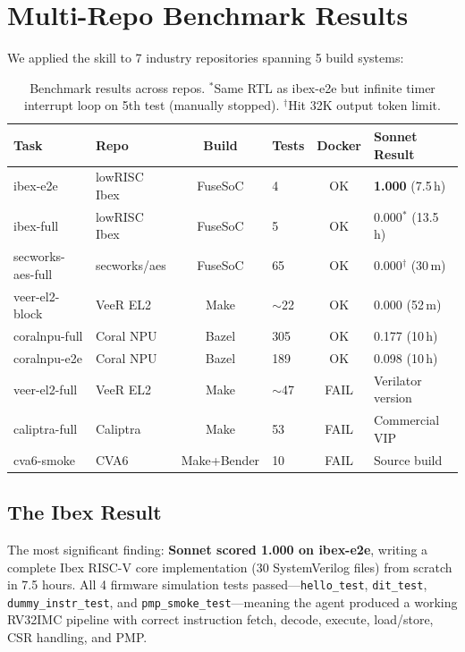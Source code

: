 \documentclass[11pt,a4paper]{article}
\begin{document}
\section{Multi-Repo Benchmark Results}

We applied the skill to 7 industry repositories spanning 5 build systems:

\begin{table}[h]
\centering
\small
\begin{tabularx}{\textwidth}{@{}llclcX@{}}
\toprule
\textbf{Task} & \textbf{Repo} & \textbf{Build} & \textbf{Tests} & \textbf{Docker} & \textbf{Sonnet Result} \\
\midrule
ibex-e2e & lowRISC Ibex & FuseSoC & 4 & OK & \textbf{1.000} (7.5\,h) \\
ibex-full & lowRISC Ibex & FuseSoC & 5 & OK & 0.000$^*$ (13.5\,h) \\
secworks-aes-full & secworks/aes & FuseSoC & 65 & OK & 0.000$^\dagger$ (30\,m) \\
veer-el2-block & VeeR EL2 & Make & $\sim$22 & OK & 0.000 (52\,m) \\
coralnpu-full & Coral NPU & Bazel & 305 & OK & 0.177 (10\,h) \\
coralnpu-e2e & Coral NPU & Bazel & 189 & OK & 0.098 (10\,h) \\
\midrule
veer-el2-full & VeeR EL2 & Make & $\sim$47 & FAIL & Verilator version \\
caliptra-full & Caliptra & Make & 53 & FAIL & Commercial VIP \\
cva6-smoke & CVA6 & Make+Bender & 10 & FAIL & Source build \\
\bottomrule
\end{tabularx}
\caption{Benchmark results across repos. $^*$Same RTL as ibex-e2e but infinite timer interrupt loop on 5th test (manually stopped). $^\dagger$Hit 32K output token limit.}
\label{tab:results}
\end{table}

\subsection{The Ibex Result}

The most significant finding: \textbf{Sonnet scored 1.000 on ibex-e2e}, writing a complete Ibex RISC-V core implementation (30 SystemVerilog files) from scratch in 7.5 hours. All 4 firmware simulation tests passed---\texttt{hello\_test}, \texttt{dit\_test}, \texttt{dummy\_instr\_test}, and \texttt{pmp\_smoke\_test}---meaning the agent produced a working RV32IMC pipeline with correct instruction fetch, decode, execute, load/store, CSR handling, and PMP.
\end{document}
